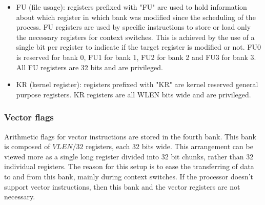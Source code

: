 \documentclass{article}
\begin{document}
\begin{itemize}
                    \item FU (file usage): registers prefixed with "FU" are used to hold information about which register in which bank was modified since the scheduling of the process. FU registers are used by specific instructions to store or load only the necessary registers for context switches. This is achieved by the use of a single bit per register to indicate if the target register is modified or not. FU0 is reserved for bank 0, FU1 for bank 1, FU2 for bank 2 and FU3 for bank 3. All FU registers are 32 bits and are privileged.

                    \item KR (kernel register): registers prefixed with "KR" are kernel reserved general purpose registers. KR registers are all WLEN bits wide and are privileged.

                \end{itemize}


            \subsubsection{Vector flags}

                Arithmetic flags for vector instructions are stored in the fourth bank. This bank is composed of \(VLEN/32\) registers, each 32 bits wide. This arrangement can be viewed more as a single long register divided into 32 bit chunks, rather than 32 individual registers. The reason for this setup is to ease the transferring of data to and from this bank, mainly during context switches. If the processor doesn't support vector instructions, then this bank and the vector registers are not necessary.
\end{document}
